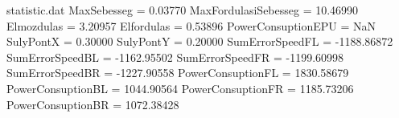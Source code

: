 \begin{filecontents*}{statistic.dat}
MaxSebesseg =    0.03770
MaxFordulasiSebesseg =   10.46990
Elmozdulas =    3.20957
Elfordulas =    0.53896
PowerConsuptionEPU =        NaN
SulyPontX =    0.30000
SulyPontY =    0.20000
SumErrorSpeedFL = -1188.86872
SumErrorSpeedBL = -1162.95502
SumErrorSpeedFR = -1199.60998
SumErrorSpeedBR = -1227.90558
PowerConsuptionFL = 1830.58679
PowerConsuptionBL = 1044.90564
PowerConsuptionFR = 1185.73206
PowerConsuptionBR = 1072.38428
\end{filecontents*}
